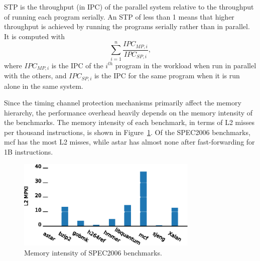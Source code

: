 STP is the throughput (in IPC) of the parallel system relative to the throughput 
of running each program serially. An STP of less than 1 means that higher 
throughput is achieved by running the programs serially rather than in 
parallel.
It is computed with
\begin{equation}
  \sum^n_{i=1} \frac{IPC_{MP,i}}{IPC_{SP,i}},
\end{equation}
where $IPC_{MP,i}$ is the IPC of the $i^{th}$ program in the workload when run 
in parallel with the others, and $IPC_{SP,i}$ is the IPC for the same program 
when it is run alone in the same system.


Since the timing channel protection mechanisms primarily affect the 
memory hierarchy, the performance overhead heavily depends on the memory intensity 
of the benchmarks.
The memory intensity of each benchmark, in terms of L2 misses per thousand 
instructions, is shown in
Figure~\ref{fig:memstudy}. Of the SPEC2006 benchmarks, mcf has the most L2 misses,
while astar has almost none after fast-forwarding for 1B instructions.

\begin{figure}
    \begin{center}
        \includegraphics[width=3.4in]{figs/MPKI.eps}
        \caption{Memory intensity of SPEC2006 benchmarks.}
        \label{fig:memstudy}
    \end{center}
\end{figure}

